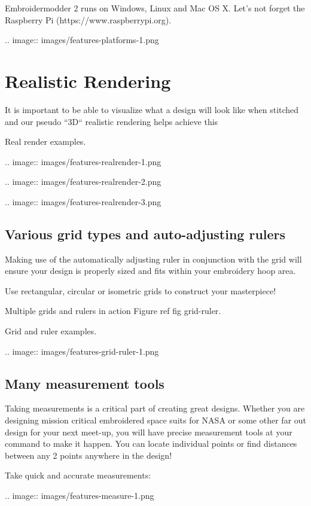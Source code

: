 \documentclass[a4paper]{report}
\begin{document}
Embroidermodder 2 runs on Windows, Linux and Mac OS X. Let's not forget the  Raspberry
Pi (https://www.raspberrypi.org).

.. image::
   images/features-platforms-1.png

\section{Realistic Rendering}

It is important to be able to visualize what a design will look like when stitched and our
pseudo ``3D`` realistic rendering helps achieve this

Real render examples.

.. image::
   images/features-realrender-1.png

.. image::
   images/features-realrender-2.png

.. image::
   images/features-realrender-3.png

\subsection{Various grid types and auto-adjusting rulers}

Making use of the automatically adjusting ruler in conjunction with the grid will ensure your
design is properly sized and fits within your embroidery hoop area.

Use rectangular, circular or isometric grids to construct your masterpiece!

Multiple grids and rulers in action Figure ref fig grid-ruler.

Grid and ruler examples.

.. image::
   images/features-grid-ruler-1.png

\subsection{Many measurement tools}

Taking measurements is a critical part of creating great designs. Whether you are designing
mission critical embroidered space suits for NASA or some other far out design for your next
meet-up, you will have precise measurement tools at your command to make it happen. You can
locate individual points or find distances between any 2 points anywhere in the design!

Take quick and accurate measurements:

.. image::
   images/features-measure-1.png
\end{document}
